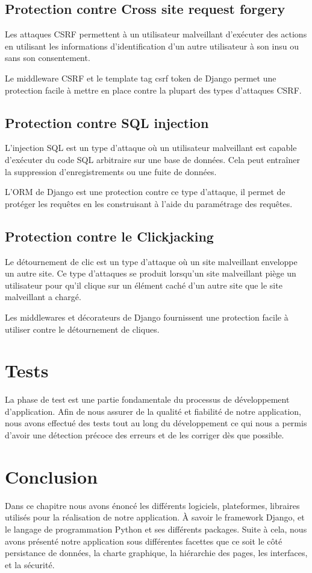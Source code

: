 \subsection{Protection contre Cross site request forgery}
Les attaques CSRF permettent à un utilisateur malveillant d'exécuter des actions 
en utilisant les informations d'identification d'un autre utilisateur à son insu 
ou sans son consentement.

Le middleware CSRF et le template tag csrf token de Django permet une protection 
facile à mettre en place contre la plupart des types d'attaques CSRF.

\subsection{Protection contre SQL injection}
L'injection SQL est un type d'attaque où un utilisateur malveillant est capable 
d'exécuter du code SQL arbitraire sur une base de données. Cela peut entraîner 
la suppression d'enregistrements ou une fuite de données.

L’ORM de Django est une protection contre ce type d’attaque, il permet de 
protéger les requêtes en les construisant à l'aide du paramétrage des requêtes.

\subsection{Protection contre le Clickjacking}
Le détournement de clic est un type d'attaque où un site malveillant enveloppe 
un autre site. Ce type d’attaques se produit lorsqu’un site malveillant piège un 
utilisateur pour qu’il clique sur un élément caché d’un autre site que le site 
malveillant a chargé. 

Les middlewares et décorateurs de Django fournissent une protection facile à 
utiliser contre le détournement de cliques.

\section{Tests}
La phase de test est une partie fondamentale du processus de développement 
d’application. Afin de nous assurer de la qualité et fiabilité de notre 
application, nous avons effectué des tests tout au long du développement ce qui 
nous a permis d’avoir une détection précoce des erreurs et de les corriger dès 
que possible.

\section{Conclusion}
Dans ce chapitre nous avons énoncé les différents logiciels, plateformes,
libraires utilisés pour la réalisation de notre application. À savoir le
framework Django, et le langage de programmation Python et ses différents
packages.  Suite à cela, nous avons présenté notre application sous différentes
facettes que ce soit le côté persistance de données, la charte graphique, la
hiérarchie des pages, les interfaces, et la sécurité.

